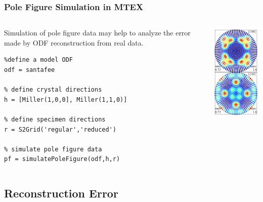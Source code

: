 \documentclass{beamer}
\newcommand{\mtex}{{\large \bf{\color{red}M}TEX\,}}%
\begin{document}
\begin{frame}[fragile]
  \frametitle{Pole Figure Simulation in \mtex}

  \begin{columns}
    \begin{column}{8cm}

      Simulation of pole figure data may help to analyze the error made by ODF
      reconstruction from real data.

\begin{lstlisting}
%define a model ODF
odf = santafee                  

% define crystal directions
h = [Miller(1,0,0], Miller(1,1,0)]

% define specimen directions
r = S2Grid('regular','reduced') 

% simulate pole figure data
pf = simulatePoleFigure(odf,h,r)
\end{lstlisting}      
    \end{column}

    \begin{column}{4cm}
      \centerline{
      \includegraphics[width=4cm]{pic/simpf}}
    \end{column}

  \end{columns}
 
\end{frame}

\subsection{Reconstruction Error}
\end{document}
